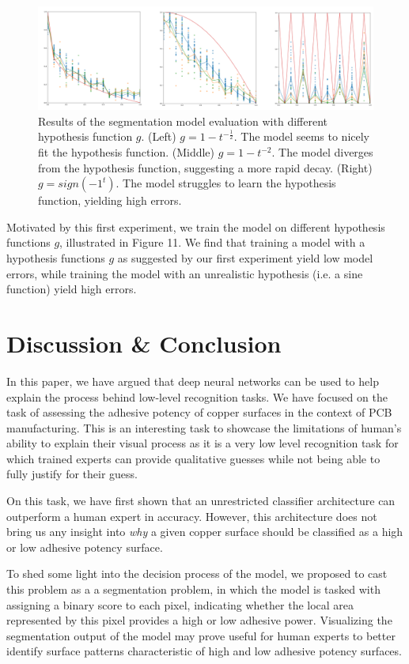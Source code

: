 \documentclass[10pt,twocolumn,letterpaper]{article}
\begin{document}
\begin{figure}[ht]
\centering
\includegraphics[width=0.9\linewidth]{"./figures/Figure11"}
\caption{
Results of the segmentation model evaluation with different hypothesis function $g$.
(Left) $g=1-t^{-\frac{1}{2}}$. The model seems to nicely fit the hypothesis function.
(Middle) $g=1-t^{-2}$. The model diverges from the hypothesis function, suggesting a more rapid decay.
(Right) $g=sign(-1^{t})$. The model struggles to learn the hypothesis function, yielding high errors.
}
\end{figure}

Motivated by this first experiment, 
we train the model on different hypothesis functions $g$,
illustrated in Figure 11.
We find that training a model with a hypothesis functions $g$ as suggested by our first experiment
yield low model errors, while training the model with an unrealistic hypothesis (i.e. a sine function)
yield high errors. 



\section{Discussion \& Conclusion}

In this paper, we have argued that deep neural networks can be used to 
help explain the process behind low-level recognition tasks.
We have focused on the task of assessing the adhesive potency 
of copper surfaces in the context of PCB manufacturing.
This is an interesting task to showcase the limitations of human's ability to explain their visual process
as it is a very low level recognition task for which trained experts can provide qualitative guesses while
not being able to fully justify for their guess.

On this task, we have first shown that an unrestricted classifier 
architecture can outperform a human expert in accuracy.
However, this architecture does not bring us any insight 
into \textit{why} a given copper surface should be classified 
as a high or low adhesive potency surface.

To shed some light into the decision process of the model,
we proposed to cast this problem as a a segmentation problem, 
in which the model is tasked with assigning a binary score to each pixel,
indicating whether the local area represented by this pixel provides a high or low adhesive power.
Visualizing the segmentation output of the model may prove useful for 
human experts to better identify surface patterns characteristic of high and low 
adhesive potency surfaces.
\end{document}
